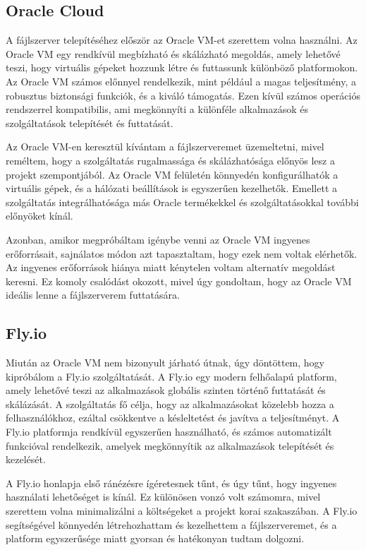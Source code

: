 \subsection{Oracle Cloud}
A fájlszerver telepítéséhez először az Oracle VM-et \cite{CloudInf58:online} szerettem volna használni. Az Oracle VM egy rendkívül megbízható és skálázható megoldás, amely lehetővé teszi, hogy virtuális gépeket hozzunk létre és futtassunk különböző platformokon. Az Oracle VM számos előnnyel rendelkezik, mint például a magas teljesítmény, a robusztus biztonsági funkciók, és a kiváló támogatás. Ezen kívül számos operációs rendszerrel kompatibilis, ami megkönnyíti a különféle alkalmazások és szolgáltatások telepítését és futtatását.

Az Oracle VM-en keresztül kívántam a fájlszerveremet üzemeltetni, mivel reméltem, hogy a szolgáltatás rugalmassága és skálázhatósága előnyös lesz a projekt szempontjából. Az Oracle VM felületén könnyedén konfigurálhatók a virtuális gépek, és a hálózati beállítások is egyszerűen kezelhetők. Emellett a szolgáltatás integrálhatósága más Oracle termékekkel és szolgáltatásokkal további előnyöket kínál.

Azonban, amikor megpróbáltam igénybe venni az Oracle VM ingyenes erőforrásait, sajnálatos módon azt tapasztaltam, hogy ezek nem voltak elérhetők. 
Az ingyenes erőforrások hiánya miatt kénytelen voltam alternatív megoldást keresni.
 Ez komoly csalódást okozott, mivel úgy gondoltam, hogy az Oracle VM ideális lenne a fájlszerverem futtatására.


\subsection{Fly.io}
Miután az Oracle VM nem bizonyult járható útnak, úgy döntöttem, hogy kipróbálom a Fly.io \cite{Deployap0:online} szolgáltatását.
A Fly.io egy modern felhőalapú platform, amely lehetővé teszi az alkalmazások globális szinten történő futtatását és skálázását.
A szolgáltatás fő célja, hogy az alkalmazásokat közelebb hozza a felhasználókhoz, ezáltal csökkentve a késleltetést és javítva a teljesítményt.
A Fly.io platformja rendkívül egyszerűen használható, és számos automatizált funkcióval rendelkezik, amelyek megkönnyítik az alkalmazások telepítését és kezelését.

A Fly.io honlapja első ránézésre ígéretesnek tűnt, és úgy tűnt, hogy ingyenes használati lehetőséget is kínál.
Ez különösen vonzó volt számomra, mivel szerettem volna minimalizálni a költségeket a projekt korai szakaszában.
A Fly.io segítségével könnyedén létrehozhattam és kezelhettem a fájlszerveremet, és a platform egyszerűsége miatt gyorsan és hatékonyan tudtam dolgozni.

